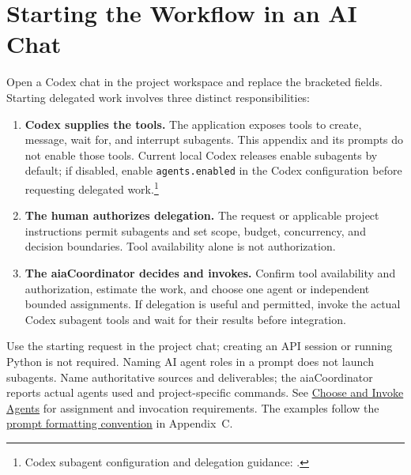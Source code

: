 \section{Starting the Workflow in an AI Chat}
\label{Section:AIImplementationStart}
Open a Codex chat in the project workspace and replace the bracketed fields.
Starting delegated work involves three distinct responsibilities:
\begin{enumerate}
\item \textbf{Codex supplies the tools.} The application exposes tools to
create, message, wait for, and interrupt subagents. This appendix and its
prompts do not enable those tools. Current local Codex releases enable
subagents by default; if disabled, enable \texttt{agents.enabled} in the
Codex configuration before requesting delegated work.\footnote{Codex subagent
configuration and delegation guidance: \cite{CodexSubagents}.}
\item \textbf{The human authorizes delegation.} The request or applicable
project instructions permit subagents and set scope, budget, concurrency,
and decision boundaries. Tool availability alone is not authorization.
\item \textbf{The aiaCoordinator decides and invokes.} Confirm tool availability
and authorization, estimate the work, and choose one agent or independent
bounded assignments. If delegation is useful and permitted, invoke the
actual Codex subagent tools and wait for their results before integration.
\end{enumerate}
Use the starting request in the project chat; creating an API session or
running Python is not required. Naming AI agent roles in a prompt does not
launch subagents. Name authoritative sources and deliverables; the
aiaCoordinator reports actual agents used and project-specific commands.
See \hyperref[Section:AIAgentDelegation]{Choose and Invoke Agents} for assignment
and invocation requirements. The examples follow the
\hyperref[Section:AIPromptFormatting]{prompt formatting convention} in Appendix~C.


